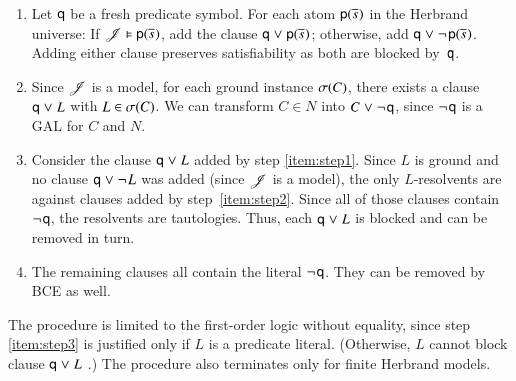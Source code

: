 \begin{enumerate}
   \item \label{item:step1}
   Let $\mathsf{q}$ be a fresh predicate symbol. For each atom
   $\mathsf{p}(\overline{s}_{})$ in the Herbrand universe: If
   $\mathscr{J} \vDash \mathsf{p}(\overline{s}_{})$, add the clause $\mathsf{q} \mathrel{\lor}
   \mathsf{p}(\overline{s}_{})$; otherwise, add %
   $\mathsf{q} \mathrel{\lor} \neg{\kern.2ex \mathsf{p}(\overline{s}_{})}$. Adding either clause
   preserves satisfiability as both are blocked by~$\mathsf{q}$.
   \smallskip
   \item \label{item:step2}
   Since $\mathscr{J}$ is a model, for each ground instance $\sigma(C)$, there exists a clause
   $\mathsf{q} \mathrel{\lor} L$ with $L \in \sigma(C)$. We can transform $C \in N$ into
   $C \mathrel{\lor} \neg{\kern.2ex \mathsf{q}}$, since $\neg{\kern.2ex \mathsf{q}}$ is a GAL for $C$ and $N$.

   \smallskip
   \item \label{item:step3}
   Consider the clause $\mathsf{q} \mathrel{\lor} L$ added by step \ref{item:step1}. Since
   $L$ is ground and no clause $\mathsf{q} \mathrel{\lor} \neg{\kern.2ex L}$ was added (since $\mathscr{J}$ is a
   model), the only $L$-resolvents are against clauses added by step~\ref{item:step2}.
   Since all of those clauses contain $\neg{\kern.2ex \mathsf{q}}$, the resolvents are tautologies. 
   Thus, each $\mathsf{q} \mathrel{\lor} L$ is blocked and can be removed in turn.

   \smallskip
   \item The remaining clauses all contain the literal $\neg{\kern.2ex \mathsf{q}}$. They can be removed
   by BCE as well.
\end{enumerate}


The procedure is limited to the first-order logic without equality, since step
\ref{item:step3} is justified only if $L$ is a predicate literal. (Otherwise,
$L$ cannot block clause $\mathsf{q} \mathrel{\lor} L$ \cite{ksstb-2017-blockedfol}.) The
procedure also terminates only for finite Herbrand models. 


